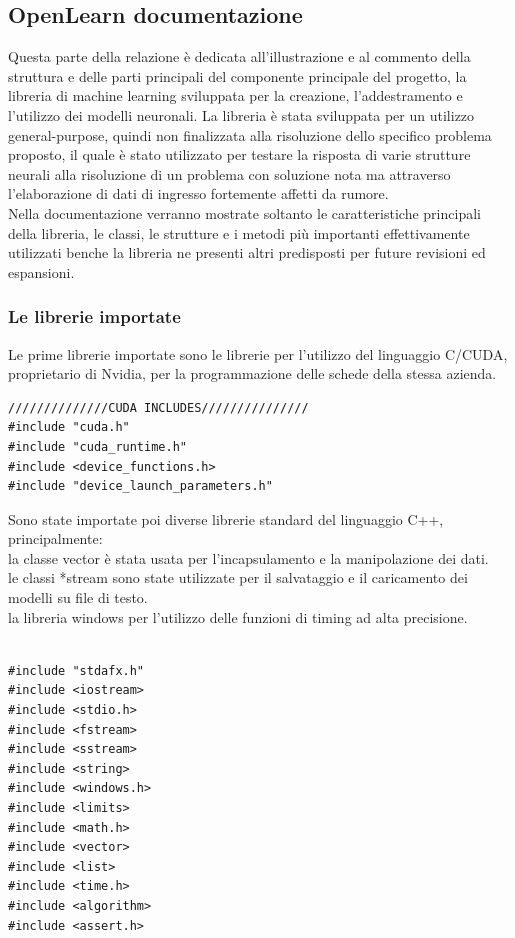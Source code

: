 \documentclass[10pt,a4paper]{article}
\begin{document}
\subsection{OpenLearn documentazione}
Questa parte della relazione è dedicata all'illustrazione e al commento della struttura e delle parti principali  del componente principale del progetto, la libreria di machine learning sviluppata per la creazione, l'addestramento e l'utilizzo dei modelli neuronali.
La libreria è stata sviluppata per un utilizzo general-purpose, quindi non finalizzata alla risoluzione dello specifico problema proposto, il quale è stato utilizzato per testare la risposta di varie strutture neurali alla risoluzione di un problema con soluzione nota ma attraverso l'elaborazione di dati di ingresso fortemente affetti da rumore.
\\
Nella documentazione verranno mostrate soltanto le caratteristiche principali della libreria, le classi, le strutture e i metodi più importanti effettivamente utilizzati benche la libreria ne presenti altri predisposti per future revisioni ed espansioni.

\subsubsection{Le librerie importate}
Le prime librerie importate sono le librerie per l'utilizzo del linguaggio C/CUDA, proprietario di Nvidia, per la programmazione delle schede della stessa azienda.
\begin{lstlisting}[style=mycuda, caption=librerie cuda, captionpos=b]
//////////////CUDA INCLUDES///////////////
#include "cuda.h"
#include "cuda_runtime.h"
#include <device_functions.h>
#include "device_launch_parameters.h"

\end{lstlisting}
Sono state importate poi diverse librerie standard del linguaggio C++, principalmente:\\
la classe vector è stata usata per l'incapsulamento e la manipolazione dei dati.\\
le classi *stream sono state utilizzate per il salvataggio e il caricamento dei modelli su file di testo.\\
la libreria windows per l'utilizzo delle funzioni di timing ad alta precisione.\\

\begin{lstlisting}[style=mycuda, caption=librerie STD, captionpos=b]

#include "stdafx.h"
#include <iostream>
#include <stdio.h>
#include <fstream>
#include <sstream>
#include <string>
#include <windows.h>
#include <limits>
#include <math.h>
#include <vector>
#include <list>
#include <time.h>
#include <algorithm>
#include <assert.h>

\end{lstlisting}
\end{document}
